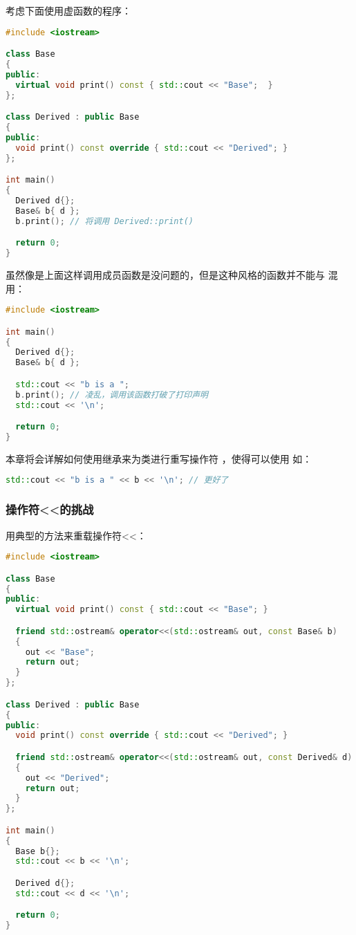 \documentclass[../../LearnCpp.tex]{subfiles}
\begin{document}

考虑下面使用虚函数的程序：

\begin{lstlisting}[language=C++]
#include <iostream>

class Base
{
public:
  virtual void print() const { std::cout << "Base";  }
};

class Derived : public Base
{
public:
  void print() const override { std::cout << "Derived"; }
};

int main()
{
  Derived d{};
  Base& b{ d };
  b.print(); // 将调用 Derived::print()

  return 0;
}
\end{lstlisting}

虽然像是上面这样调用成员函数是没问题的，但是这种风格的函数并不能与  混用：

\begin{lstlisting}[language=C++]
#include <iostream>

int main()
{
  Derived d{};
  Base& b{ d };

  std::cout << "b is a ";
  b.print(); // 凌乱，调用该函数打破了打印声明
  std::cout << '\n';

  return 0;
}
\end{lstlisting}

本章将会详解如何使用继承来为类进行重写操作符 \acode{<<}，使得可以使用 \acode{<<} 如：

\begin{lstlisting}[language=C++]
std::cout << "b is a " << b << '\n'; // 更好了
\end{lstlisting}

\subsubsection*{操作符<<的挑战}

用典型的方法来重载操作符<<：

\begin{lstlisting}[language=C++]
#include <iostream>

class Base
{
public:
  virtual void print() const { std::cout << "Base"; }

  friend std::ostream& operator<<(std::ostream& out, const Base& b)
  {
    out << "Base";
    return out;
  }
};

class Derived : public Base
{
public:
  void print() const override { std::cout << "Derived"; }

  friend std::ostream& operator<<(std::ostream& out, const Derived& d)
  {
    out << "Derived";
    return out;
  }
};

int main()
{
  Base b{};
  std::cout << b << '\n';

  Derived d{};
  std::cout << d << '\n';

  return 0;
}
\end{lstlisting}
\end{document}

